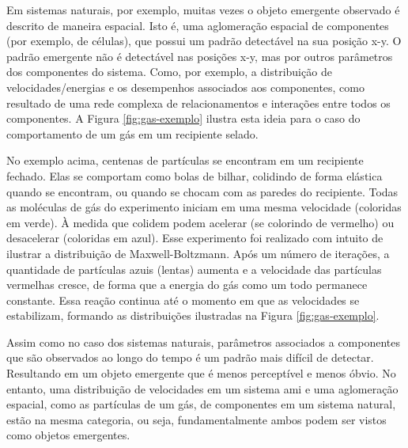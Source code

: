     Em sistemas naturais, por exemplo, muitas vezes o objeto emergente observado é descrito de maneira espacial. Isto é, uma aglomeração espacial de componentes (por exemplo, de células), que possui um padrão detectável na sua posição x-y. O padrão emergente não é detectável nas posições x-y, mas por outros parâmetros dos componentes do sistema. Como, por exemplo, a distribuição de velocidades/energias e os desempenhos associados aos componentes, como resultado de uma rede complexa de relacionamentos e interações entre todos os componentes. A Figura \ref{fig:gas-exemplo} ilustra esta ideia para o caso do comportamento de um gás em um recipiente selado. 
    
    \begin{figure}[h!]
        \centering
    \end{figure}
    
    
    No exemplo acima, centenas de partículas se encontram em um recipiente fechado. Elas se comportam como bolas de bilhar, colidindo de forma elástica quando se encontram, ou quando se chocam com as paredes do recipiente. Todas as moléculas de gás do experimento iniciam em uma mesma velocidade (coloridas em verde). À medida que colidem podem acelerar (se colorindo de vermelho) ou desacelerar (coloridas em azul). Esse experimento foi realizado com intuito de ilustrar a distribuição de Maxwell-Boltzmann.  Após um número de iterações, a quantidade de partículas azuis (lentas) aumenta e a velocidade das partículas vermelhas cresce, de forma que a energia do gás como um todo permanece constante. Essa reação continua até o momento em que as velocidades se estabilizam, formando as distribuições ilustradas na Figura \ref{fig:gas-exemplo}.

    Assim como no caso dos sistemas naturais, parâmetros associados a componentes que são observados ao longo do tempo é um padrão mais difícil de detectar. Resultando em um objeto emergente que é menos perceptível e menos óbvio. No entanto, uma distribuição de velocidades em um sistema \acrshort{ami} e uma aglomeração espacial, como as partículas de um gás, de componentes em um sistema natural, estão na mesma categoria, ou seja, fundamentalmente ambos podem ser vistos como objetos emergentes.
    
